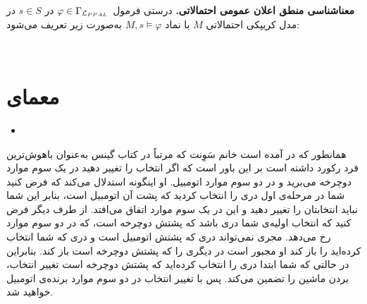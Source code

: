 \begin{definition}\label{semanticK}{\textbf{معناشناسی منطق اعلان عمومی احتمالاتی.}} 
درستی فرمول $ \varphi\in\Gamma_{\mathcal{L}_{PPAL}} $ در $ s\in S $ در مدل کریپکی احتمالاتی $ M $ با نماد $ M,s\vDash\varphi $ به‌صورت زیر تعریف می‌شود:
\\






\\
\end{definition}
\section{معمای \texorpdfstring{ }{Monty Hall}}
\begin{itemize}
\item[]
\end{itemize}

همانطور که در \citep{Kooi2003} آمده است خانم سَوِنت که مرتباً در کتاب گینس به‌عنوان باهوش‌ترین فرد رکورد داشته است بر این باور است که اگر انتخاب را تغییر دهید در یک سوم موارد دوچرخه می‌برید و در دو سوم موارد اتومبیل. او اینگونه استدلال می‌کند که فرض کنید شما در مرحله‌ی اول دری را انتخاب کردید که پشت آن اتومبیل است، بنابر این شما نباید انتخابتان را تغییر دهید و این در یک سوم موارد اتفاق می‌افتد. از طرف دیگر فرض کنید که انتخاب اولیه‌ی شما دری باشد که پشتش دوچرخه است، که در دو سوم موارد رخ می‌دهد. مجری نمی‌تواند دری که پشتش اتومبیل است و دری که شما انتخاب کرده‌اید را باز کند او مجبور است در دیگری را که پشتش دوچرخه است باز کند. بنابراین در حالتی که شما ابتدا دری را انتخاب کرده‌اید که پشتش دوچرخه است تغییر انتخاب، بردن ماشین را تضمین می‌کند. پس با تغییر انتخاب در دو سوم موارد برنده‌ی اتومبیل خواهید شد.

